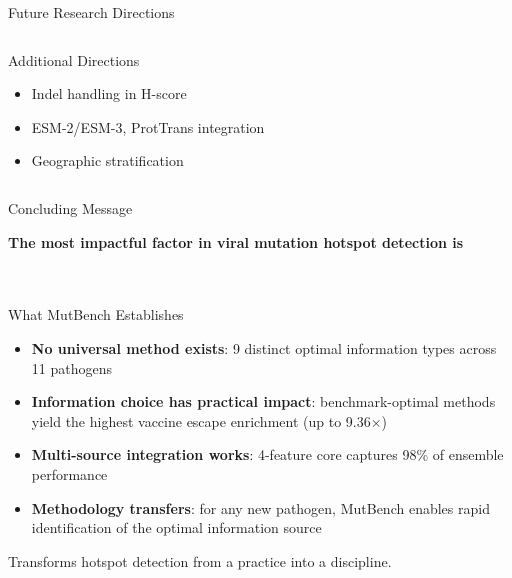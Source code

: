 \begin{frame}{Future Research Directions}
\begin{columns}[T]
    \vspace{0.5em}
    \begin{block}{Additional Directions}
      \begin{itemize}
        \item Indel handling in H-score
        \item ESM-2/ESM-3, ProtTrans integration
        \item Geographic stratification
      \end{itemize}
    \end{block}
  \end{columns}
\end{frame}

\begin{frame}{Concluding Message}
  \begin{center}
    \vspace{1em}
    {\Large\bfseries The most impactful factor in viral mutation hotspot detection is}\\[0.8em]
    {\LARGE{}}\\[0.5em]
    {\LARGE{}}\\[1.5em]
  \end{center}

  \begin{block}{What MutBench Establishes}
    \begin{itemize}
      \item \textbf{No universal method exists}: 9 distinct optimal information types across 11 pathogens
      \item \textbf{Information choice has practical impact}: benchmark-optimal methods yield the highest vaccine escape enrichment (up to 9.36$\times$)
      \item \textbf{Multi-source integration works}: 4-feature core captures 98\% of ensemble performance
      \item \textbf{Methodology transfers}: for any new pathogen, MutBench enables rapid identification of the optimal information source
    \end{itemize}
  \end{block}

  \vspace{0.5em}
  \centering
  \small Transforms hotspot detection from a  practice into a  discipline.
\end{frame}
